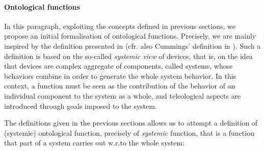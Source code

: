 \documentclass[sw]{iosart2x}
\newcommand{\firstTimeKeyWord}[1]{\textit{#1}}
\newcommand{\myComment}[1]{}
\begin{document}


\paragraph{Ontological functions}
{In this paragraph, exploiting the concepts defined in previous sections, we propose an initial formalisation of ontological functions. 
Precisely, we are mainly inspired by the definition presented in \cite{mizoguchiUnifyingDefinitionArtifact2016} (cfr. also Cummings' definition in \cite{cumminsFunctionalAnalysis1975}).
Such a definition is based on the so-called \firstTimeKeyWord{systemic view} of devices, that is, on the idea that devices are complex aggregate of components, called systems, whose behaviors combine in order to generate the whole system behavior. 
In this context, a function must be seen as the contribution of the behavior of an individual component to the system as a whole, and teleological aspects are introduced through goals imposed to \myComment{selected for} the system.  


The definitions given in the previous sections allows us to attempt a definition of (systemic) ontological function, precisely of \firstTimeKeyWord{systemic} function, that is a function that part of a system carries out w.r.to the whole system: 

}
\end{document}
